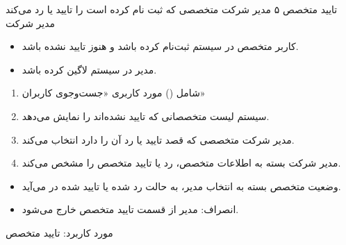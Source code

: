 \usecase
{تایید متخصص}
{۵}
{مدیر شرکت متخصصی که ثبت نام کرده است را تایید یا رد می‌کند}
{مدیر شرکت}
{}
{
	\begin{itemize}
	\item 
	کاربر متخصص در سیستم ثبت‌نام کرده باشد و هنوز تایید نشده باشد.
	
	\item
مدیر در سیستم لاگین کرده باشد.
\end{itemize}
}
{
\begin{enumerate}
	\item 
	شامل () مورد کاربری «جست‌وجوی کاربران»
	\item
	سیستم لیست متخصصانی که تایید نشده‌اند را نمایش می‌دهد.
	
	\item 
	مدیر شرکت متخصصی که قصد تایید یا رد آن را دارد انتخاب می‌کند.
	
	\item 
	مدیر شرکت بسته به اطلاعات متخصص، رد یا تایید متخصص را مشخص می‌کند.
\end{enumerate}
}
{\begin{itemize}
	\item
	وضعیت متخصص بسته به انتخاب مدیر، به حالت رد شده یا تایید شده در می‌آید.
\end{itemize}}
{
\begin{itemize}
	\item انصراف: مدیر از قسمت تایید متخصص خارج می‌شود.
\end{itemize}
}
{مورد کاربرد: تایید متخصص}


